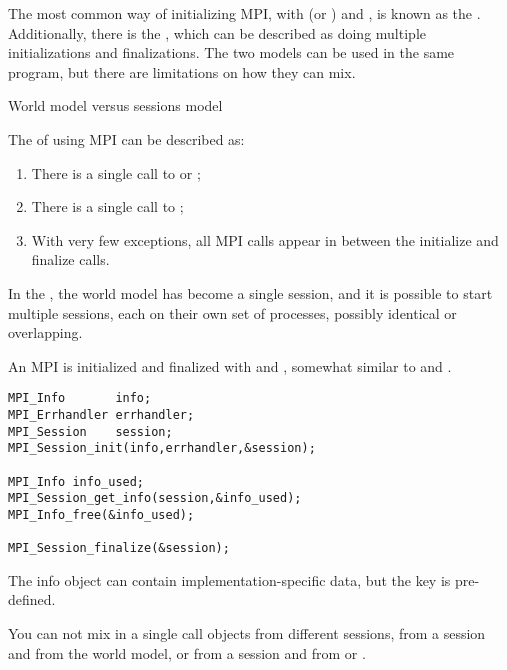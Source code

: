 \begin{mpifour}

The most common way of initializing MPI,
with  (or ) and ,
is known as the .
Additionally, there is the ,
which can be described as doing multiple initializations and finalizations.
The two models can be used in the same program, but there are limitations
on how they can mix.

 {World model versus sessions model}

The  of using MPI can be described as:
\begin{enumerate}
\item There is a single call to  or ;
\item There is a single call to ;
\item With very few exceptions, all MPI calls appear in between the initialize and finalize calls.
\end{enumerate}

In the , the world model has become a single session,
and it is possible to start multiple sessions, each on their own set of processes,
possibly identical or overlapping.

An MPI  is initialized and finalized
with  and ,
somewhat similar to  and .

\begin{lstlisting}
MPI_Info       info;
MPI_Errhandler errhandler;
MPI_Session    session;
MPI_Session_init(info,errhandler,&session);

MPI_Info info_used;
MPI_Session_get_info(session,&info_used);
MPI_Info_free(&info_used);

MPI_Session_finalize(&session);
\end{lstlisting}

The info object can contain implementation-specific data,
but the key  is pre-defined.

You can not mix in a single call objects
from different sessions,
from a session and from the world model,
or from a session and from 
or .


\end{mpifour}
